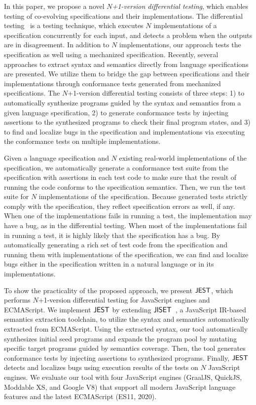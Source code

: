 In this paper, we propose a novel \textit{$N$+1-version differential testing}, which
enables testing of co-evolving specifications and their implementations.  The
differential testing~\cite{diff-test} is a testing technique, which executes $N$
implementations of a specification concurrently for each input, and detects a
problem when the outputs are in disagreement.  In addition to $N$
implementations, our approach tests the specification as well using a
mechanized specification.  Recently, several approaches to extract syntax and
semantics directly from language specifications are presented\cite{jiset,
extract-x86, extract-arm}.  We utilize them to bridge the gap between
specifications and their implementations through conformance tests generated
from mechanized specifications.  The $N$+1-version differential testing consists of
three steps: 1) to automatically synthesize programs guided by the syntax and
semantics from a given language specification, 2) to generate conformance tests
by injecting assertions to the synthesized programs to check their final program
states, and 3) to find and localize bugs in the specification and
implementations via executing the conformance tests on multiple implementations.

Given a language specification and $N$ existing real-world
implementations of the specification, we
automatically generate a conformance test suite from the specification with
assertions in each test code to make sure that the result of running the code
conforms to the specification semantics.  Then, we run the test suite for $N$
implementations of the specification.  Because generated tests strictly comply
with the specification, they reflect specification errors as well, if any.  When
one of the implementations fails in running a test, the
implementation may have a bug, as in the differential testing.  When
most of the implementations fail in running a test, it is highly likely that
the specification has a bug.  By automatically generating a rich set of test
code from the specification and running them with implementations of the
specification, we can find and localize bugs either in the specification written
in a natural language or in its implementations.

To show the practicality of the proposed approach, we present $\tool$, which
performs $N$+1-version differential testing for JavaScript engines and ECMAScript.
We implement $\tool$ by extending $\jiset$~\cite{jiset}, a JavaScript
IR-based semantics extraction toolchain, to utilize the syntax and semantics
automatically extracted from ECMAScript.  Using the extracted syntax,
our tool automatically synthesizes initial seed programs and expands the program
pool by mutating specific target programs guided by semantics coverage.  Then,
the tool generates conformance tests by injecting assertions to synthesized
programs.  Finally, $\tool$ detects and localizes bugs using execution
results of the tests on $N$ JavaScript engines.  We evaluate our tool with four
JavaScript engines (GraalJS\cite{graaljs}, QuickJS\cite{qjs}, Moddable
XS\cite{xs}, and Google V8\cite{v8}) that support all modern JavaScript language
features and the latest ECMAScript (ES11, 2020).

